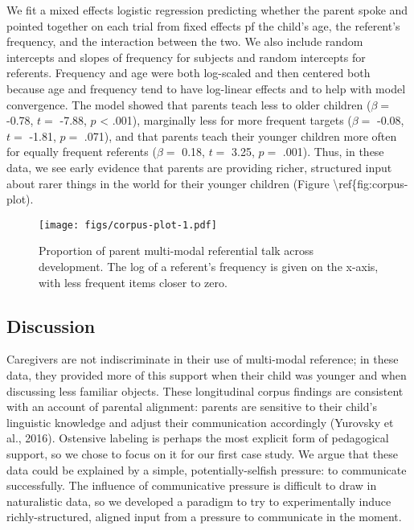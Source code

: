 \documentclass[english,,man,floatsintext]{apa6}
\begin{document}
We fit a mixed effects logistic regression predicting whether the parent spoke and pointed together on each trial from fixed effects pf the child's age, the referent's frequency, and the interaction between the two. We also include random intercepts and slopes of frequency for subjects and random intercepts for referents. Frequency and age were both log-scaled and then centered both because age and frequency tend to have log-linear effects and to help with model convergence. The model showed that parents teach less to older children (\(\beta =\) -0.78, \(t =\) -7.88, \(p\) \textless{} .001), marginally less for more frequent targets (\(\beta =\) -0.08, \(t =\) -1.81, \(p =\) .071), and that parents teach their younger children more often for equally frequent referents (\(\beta =\) 0.18, \(t =\) 3.25, \(p =\) .001). Thus, in these data, we see early evidence that parents are providing richer, structured input about rarer things in the world for their younger children (Figure \textbackslash{}ref\{fig:corpus-plot).

\begin{figure}
\centering
\texttt{[image: figs/corpus-plot-1.pdf]}
\caption{\label{fig:corpus-plot}Proportion of parent multi-modal referential talk across development. The log of a referent's frequency is given on the x-axis, with less frequent items closer to zero.}
\end{figure}

\hypertarget{discussion}{%
\subsection{Discussion}\label{discussion}}

Caregivers are not indiscriminate in their use of multi-modal reference; in these data, they provided more of this support when their child was younger and when discussing less familiar objects. These longitudinal corpus findings are consistent with an account of parental alignment: parents are sensitive to their child's linguistic knowledge and adjust their communication accordingly (Yurovsky et al., 2016). Ostensive labeling is perhaps the most explicit form of pedagogical support, so we chose to focus on it for our first case study. We argue that these data could be explained by a simple, potentially-selfish pressure: to communicate successfully. The influence of communicative pressure is difficult to draw in naturalistic data, so we developed a paradigm to try to experimentally induce richly-structured, aligned input from a pressure to communicate in the moment.
\end{document}
